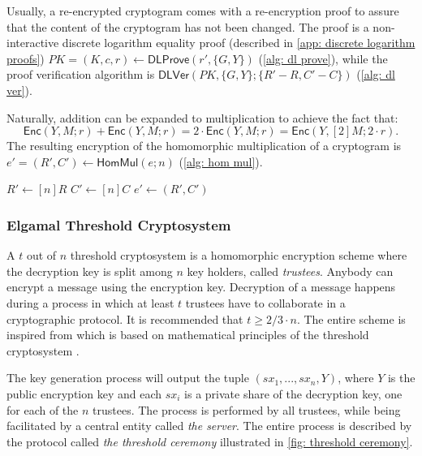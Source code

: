 Usually, a re-encrypted cryptogram comes with a re-encryption proof to assure that the content of the cryptogram has not been changed. The proof is a non-interactive discrete logarithm equality proof (described in \cref{app: discrete logarithm proofs}) $PK = (K, c, r) \gets \mathsf{DLProve} (r', \{G, Y\})$ (\cref{alg: dl prove}), while the proof verification algorithm is $\mathsf{DLVer} (PK, \{G, Y\}; \{R'-R, C'-C\})$ (\cref{alg: dl ver}).

Naturally, addition can be expanded to multiplication to achieve the fact that:
\[
\mathsf{Enc}(Y, M; r) + \mathsf{Enc}(Y, M; r) = 2 \cdot \mathsf{Enc}(Y, M; r) = \mathsf{Enc}(Y, [2]M; 2 \cdot r).
\]
The resulting encryption of the homomorphic multiplication of a cryptogram is $e' = (R', C') \gets \mathsf{HomMul}(e; n)$ (\cref{alg: hom mul}).

\begin{algorithm}[ht]
    \DontPrintSemicolon
    \caption{$\mathsf{HomMul} (e; n)$}
    
    $R' \gets [n]R$ \;
    $C' \gets [n]C$ \;
    $e' \gets (R',C')$ \;
     
    
    \label{alg: hom mul}
\end{algorithm}


\subsubsection{Elgamal Threshold Cryptosystem} \label{app: elgamal threshold cryptosystem}
A $t$ out of $n$ threshold cryptosystem is a homomorphic encryption scheme where the decryption key is split among $n$ key holders, called \textit{trustees}. Anybody can encrypt a message using the encryption key. Decryption of a message happens during a process in which at least $t$ trustees have to collaborate in a cryptographic protocol. It is recommended that $t \geq 2/3 \cdot n$. The entire scheme is inspired from \cite{Pedersen91} which is based on mathematical principles of the threshold cryptosystem \cite{Desmedt89, Shamir79}.

The key generation process will output the tuple $(sx_1, ..., sx_n, Y)$, where $Y$ is the public encryption key and each $sx_i$ is a private share of the decryption key, one for each of the $n$ trustees. The process is performed by all trustees, while being facilitated by a central entity called \textit{the server}. The entire process is described by the protocol called \textit{the threshold ceremony} illustrated in \cref{fig: threshold ceremony}.

